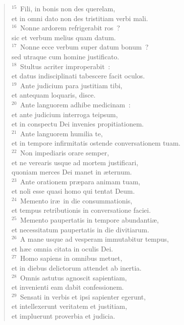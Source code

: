 \begin{verse}${}^{15}$~Fili, in bonis non des querelam,\\ et in omni dato non des tristitiam verbi mali.\\
${}^{16}$~Nonne ardorem refrigerabit ros~?\\ sic et verbum melius quam datum.\\
${}^{17}$~Nonne ecce verbum super datum bonum~?\\ sed utraque cum homine justificato.\\
${}^{18}$~Stultus acriter improperabit~:\\ et datus indisciplinati tabescere facit oculos.\\
${}^{19}$~Ante judicium para justitiam tibi,\\ et antequam loquaris, disce.\\
${}^{20}$~Ante languorem adhibe medicinam~:\\ et ante judicium interroga teipsum,\\ et in conspectu Dei invenies propitiationem.\\
${}^{21}$~Ante languorem humilia te,\\ et in tempore infirmitatis ostende conversationem tuam.\\
${}^{22}$~Non impediaris orare semper,\\ et ne verearis usque ad mortem justificari,\\ quoniam merces Dei manet in \ae ternum.\\
${}^{23}$~Ante orationem pr\ae para animam tuam,\\ et noli esse quasi homo qui tentat Deum.\\
${}^{24}$~Memento ir\ae\ in die consummationis,\\ et tempus retributionis in conversatione faciei.\\
${}^{25}$~Memento paupertatis in tempore abundanti\ae ,\\ et necessitatum paupertatis in die divitiarum.\\
${}^{26}$~A mane usque ad vesperam immutabitur tempus,\\ et h\ae c omnia citata in oculis Dei.\\
${}^{27}$~Homo sapiens in omnibus metuet,\\ et in diebus delictorum attendet ab inertia.\\
${}^{28}$~Omnis astutus agnoscit sapientiam,\\ et invenienti eam dabit confessionem.\\
${}^{29}$~Sensati in verbis et ipsi sapienter egerunt,\\ et intellexerunt veritatem et justitiam,\\ et impluerunt proverbia et judicia.\end{verse}



